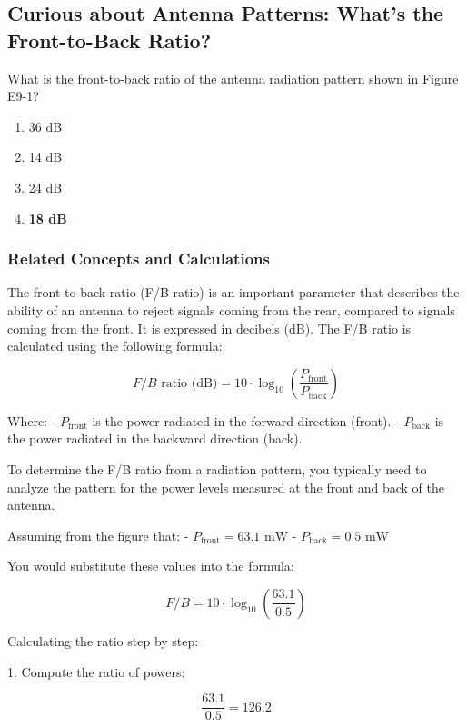 \subsection{Curious about Antenna Patterns: What's the Front-to-Back Ratio?}

\begin{tcolorbox}[colback=gray!10, colframe=black, title=E9B02] What is the front-to-back ratio of the antenna radiation pattern shown in Figure E9-1?

\begin{enumerate}[label=\Alph*.]
    \item 36 dB
    \item 14 dB
    \item 24 dB
    \item \textbf{18 dB}
\end{enumerate} \end{tcolorbox}

\subsubsection{Related Concepts and Calculations}
The front-to-back ratio (F/B ratio) is an important parameter that describes the ability of an antenna to reject signals coming from the rear, compared to signals coming from the front. It is expressed in decibels (dB). The F/B ratio is calculated using the following formula:

\[
F/B \text{ ratio (dB)} = 10 \cdot \log_{10}\left(\frac{P_{\text{front}}}{P_{\text{back}}}\right)
\]

Where:
- \(P_{\text{front}}\) is the power radiated in the forward direction (front).
- \(P_{\text{back}}\) is the power radiated in the backward direction (back).

To determine the F/B ratio from a radiation pattern, you typically need to analyze the pattern for the power levels measured at the front and back of the antenna.

Assuming from the figure that:
- \(P_{\text{front}} = 63.1 \text{ mW}\)
- \(P_{\text{back}} = 0.5 \text{ mW}\)

You would substitute these values into the formula:

\[
F/B = 10 \cdot \log_{10}\left(\frac{63.1}{0.5}\right)
\]

Calculating the ratio step by step:

1. Compute the ratio of powers:

\[
\frac{63.1}{0.5} = 126.2
\]

